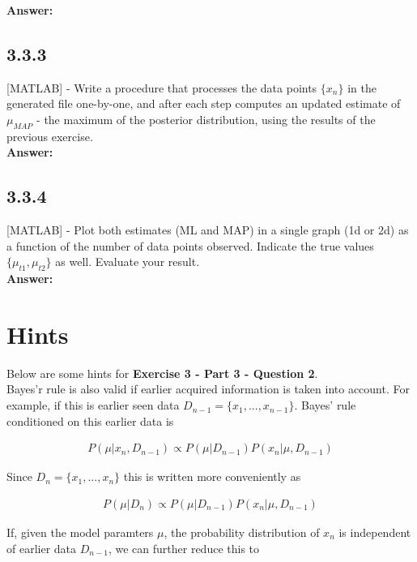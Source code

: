 \documentclass[a4paper]{article}
\begin{document}
\textbf{Answer:}\\


\subsection*{3.3.3}

[MATLAB] - Write a procedure that processes the data points $\{ x_n\}$ in the generated file one-by-one, and after each step computes an updated estimate of $\mu_{MAP}$ - the maximum of the posterior distribution, using the results of the previous exercise.\\


\textbf{Answer:}\\


\subsection*{3.3.4}

[MATLAB] - Plot both estimates (ML and MAP) in a single graph (1d or 2d) as a function of the number of data points observed. Indicate the true values $\{ \mu_{t1}, \mu_{t2}\}$ as well. Evaluate your result.\\

\textbf{Answer:}\\

\section*{Hints}

Below are some hints for \textbf{Exercise 3 - Part 3 - Question 2}.\\

Bayes'r rule is also valid if earlier acquired information is taken into account. For example, if this is earlier seen data $D_{n - 1} = \{ x_1,..., x_{n - 1}\}$. Bayes' rule conditioned on this earlier data is 

\begin{align*}
	P(\mu | x_n, D_{n - 1}) \propto P(\mu | D_{n - 1}) P(x_n | \mu, D_{n - 1})
\end{align*}

Since $D_n = \{ x_1, ..., x_n\}$ this is written more conveniently as 

\begin{align*}
	P(\mu | D_{n}) \propto P(\mu | D_{n - 1}) P(x_n | \mu, D_{n - 1})
\end{align*}


If, given the model paramters $\mu$, the probability distribution of $x_n$ is independent of earlier data $D_{n - 1}$, we can further reduce this to
\end{document}

